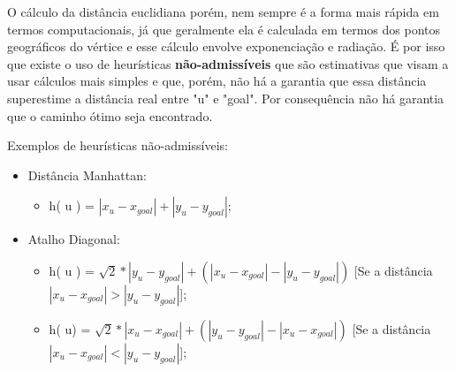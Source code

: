O cálculo da distância euclidiana porém, nem sempre é a forma mais rápida em termos computacionais, já que geralmente ela é calculada em termos dos pontos geográficos do vértice e esse cálculo envolve exponenciação e radiação. É por isso que existe o uso de heurísticas \textbf{não-admissíveis} que são estimativas que visam a usar cálculos mais simples e que, porém, não há a garantia que essa distância superestime a distância real entre "u" e "goal". Por consequência não há garantia que o caminho ótimo seja encontrado.

Exemplos de heurísticas não-admissíveis:
\begin{itemize}
\item Distância Manhattan:
\begin{itemize}
\item h( u ) = $| x_{u} - x_{goal} | + | y_{u} - y_{goal}|$;
\end{itemize}
\item Atalho Diagonal:
\begin{itemize}
\item h( u ) = $\sqrt{2} * | y_{u} - y_{goal}| + ( | x_{u} - x_{goal} | - | y_{u} - y_{goal}| )$ [Se a distância $| x_{u} - x_{goal} | > | y_{u} - y_{goal}|$];
\item h( u) = $\sqrt{2} * | x_{u} - x_{goal}| + ( | y_{u} - y_{goal}| - | x_{u} - x_{goal} | )$ [Se a distância $| x_{u} - x_{goal} | < | y_{u} - y_{goal}|$];
\end{itemize}
\end{itemize}